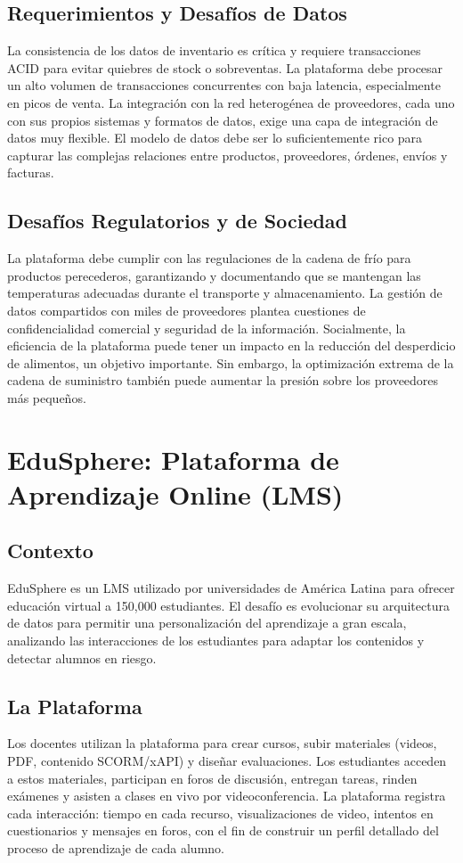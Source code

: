 \documentclass[12pt]{article}
\begin{document}
\subsection{Requerimientos y Desafíos de Datos}
La consistencia de los datos de inventario es crítica y requiere transacciones ACID para evitar quiebres de stock o sobreventas. La plataforma debe procesar un alto volumen de transacciones concurrentes con baja latencia, especialmente en picos de venta. La integración con la red heterogénea de proveedores, cada uno con sus propios sistemas y formatos de datos, exige una capa de integración de datos muy flexible. El modelo de datos debe ser lo suficientemente rico para capturar las complejas relaciones entre productos, proveedores, órdenes, envíos y facturas.

\subsection{Desafíos Regulatorios y de Sociedad}
La plataforma debe cumplir con las regulaciones de la cadena de frío para productos perecederos, garantizando y documentando que se mantengan las temperaturas adecuadas durante el transporte y almacenamiento. La gestión de datos compartidos con miles de proveedores plantea cuestiones de confidencialidad comercial y seguridad de la información. Socialmente, la eficiencia de la plataforma puede tener un impacto en la reducción del desperdicio de alimentos, un objetivo importante. Sin embargo, la optimización extrema de la cadena de suministro también puede aumentar la presión sobre los proveedores más pequeños.

\newpage

\section{EduSphere: Plataforma de Aprendizaje Online (LMS)}

\subsection{Contexto}
EduSphere es un LMS utilizado por universidades de América Latina para ofrecer educación virtual a 150,000 estudiantes. El desafío es evolucionar su arquitectura de datos para permitir una personalización del aprendizaje a gran escala, analizando las interacciones de los estudiantes para adaptar los contenidos y detectar alumnos en riesgo.

\subsection{La Plataforma}
Los docentes utilizan la plataforma para crear cursos, subir materiales (videos, PDF, contenido SCORM/xAPI) y diseñar evaluaciones. Los estudiantes acceden a estos materiales, participan en foros de discusión, entregan tareas, rinden exámenes y asisten a clases en vivo por videoconferencia. La plataforma registra cada interacción: tiempo en cada recurso, visualizaciones de video, intentos en cuestionarios y mensajes en foros, con el fin de construir un perfil detallado del proceso de aprendizaje de cada alumno.
\end{document}
